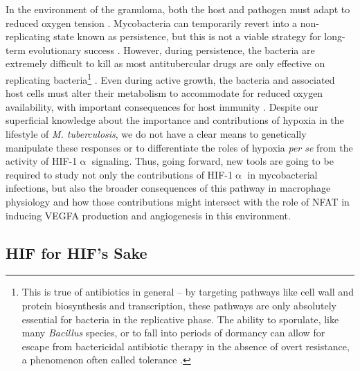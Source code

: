 In the environment of the granuloma, both the host and pathogen must adapt to reduced oxygen tension \citep{Prosser2017}. Mycobacteria can temporarily revert into a non\hyp{}replicating state known as persistence, but this is not a viable strategy for long\hyp{}term evolutionary success \citep{Ehrt2018, Stewart2003, Manabe2000, Pandey2008, zuBentrup2001}. However, during persistence, the bacteria are extremely difficult to kill as most antitubercular drugs are only effective on replicating bacteria\footnote{This is true of antibiotics in general -- by targeting pathways like cell wall and protein biosynthesis and transcription, these pathways are only absolutely essential for bacteria in the replicative phase. The ability to sporulate, like many \textit{Bacillus} species, or to fall into periods of dormancy can allow for escape from bactericidal antibiotic therapy in the absence of overt resistance, a phenomenon often called tolerance \citep{Higgins2012, Meredith2015, LevinReisman2017, Westblade2020}.} \citep{Veatch2018}. Even during active growth, the bacteria and associated host cells must alter their metabolism to accommodate for reduced oxygen availability, with important consequences for host immunity \citep{Harper2012, Tsai2006, Prosser2017, Rustad2009, Galagan2013}. Despite our superficial knowledge about the importance and contributions of hypoxia in the lifestyle of \textit{M. tuberculosis}, we do not have a clear means to genetically manipulate these responses or to differentiate the roles of hypoxia \textit{per se} from the activity of HIF\hyp{}1$\upalpha$ signaling. Thus, going forward, new tools are going to be required to study not only the contributions of HIF\hyp{}1$\upalpha$ in mycobacterial infections, but also the broader consequences of this pathway in macrophage physiology and how those contributions might intersect with the role of NFAT in inducing VEGFA production and angiogenesis in this environment.

\subsection{HIF for HIF's Sake}\label{hif4hif}

